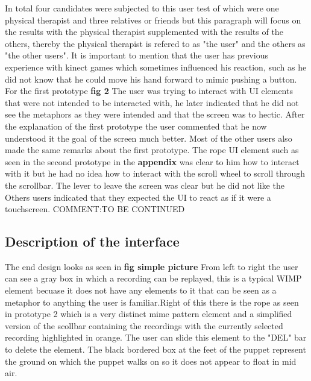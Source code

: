 In total four candidates were subjected to this user test of which were one physical therapist and three relatives or friends but this paragraph will focus on the results with the physical therapist supplemented with the results of the others, thereby the physical therapist is refered to as "the user" and the others as "the other users". It is important to mention that the user has previous experience with kinect games which sometimes influenced his reaction, such as he did not know that he could move his hand forward to mimic pushing a button. For the first prototype  \textbf{ fig 2} The user was trying to interact with UI elements that were not intended to be interacted with, he later indicated that he did not see the metaphors as they were intended and that the screen was to hectic. After the explanation of the first prototype the user commented that he now understood it the goal of the screen much better. Most of the other users also made the same remarks about the first prototype. The rope UI element such as seen in the second prototype in the \textbf{ appendix} was clear to him how to interact with it but he had no idea how to interact with the scroll wheel to scroll through the scrollbar. The lever to leave the screen was clear but he did not like the Others users indicated that they expected the UI to react as if it were a touchscreen. 
{\large COMMENT:TO BE CONTINUED}









\subsection{Description of the interface}

The end design looks as seen in \textbf{ fig simple picture} From left to right the user can see a gray box in which a recording can be replayed, this is a typical WIMP element becuase it does not have any elements to it that can be seen as a metaphor to anything the user is familiar.Right of this there is the rope as seen in prototype 2 which is a very distinct mime pattern element and a simplified version of the scollbar containing the recordings with the currently selected recording highlighted in orange. The user can slide this element to the "DEL" bar to delete the element. The black bordered box at the feet of the puppet represent the ground on which the puppet walks on so it does not appear to float in mid air.

